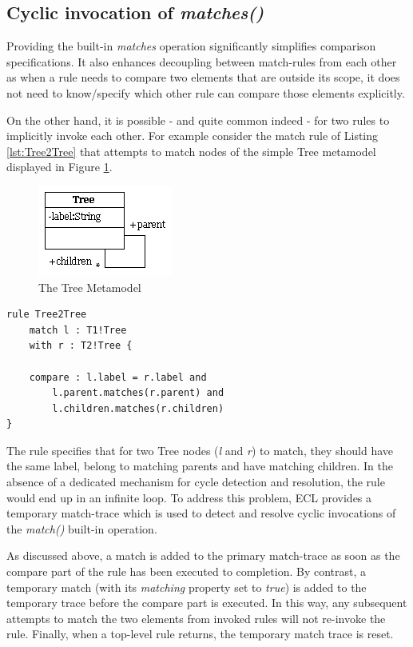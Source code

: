 \subsection{Cyclic invocation of \emph{matches()}}

Providing the built-in \emph{matches} operation significantly simplifies comparison specifications. It also enhances decoupling between match-rules from each other as when a rule needs to compare two elements that are outside its scope, it does not need to know/specify which other rule can compare those elements explicitly.

On the other hand, it is possible - and quite common indeed - for two rules to implicitly invoke each other. For example consider the match rule of Listing \ref{lst:Tree2Tree} that attempts to match nodes of the simple Tree metamodel displayed in Figure \ref{fig:Tree}.

\begin{figure}
	\centering
		\includegraphics{images/metamodels/Tree.png}
	\caption{The Tree Metamodel}
	\label{fig:Tree}
\end{figure}

\begin{lstlisting}[float=tbp, caption=The Tree2Tree rule, label=lst:Tree2Tree, language=ECL]
rule Tree2Tree 
	match l : T1!Tree
	with r : T2!Tree {
	
	compare : l.label = r.label and 
		l.parent.matches(r.parent) and
		l.children.matches(r.children)
}
\end{lstlisting}

The rule specifies that for two Tree nodes (\emph{l} and \emph{r}) to match, they should have the same label, belong to matching parents and have matching children. In the absence of a dedicated mechanism for cycle detection and resolution, the rule would end up in an infinite loop. To address this problem, ECL provides a temporary match-trace which is used to detect and resolve cyclic invocations of the \emph{match()} built-in operation.

As discussed above, a match is added to the primary match-trace as soon as the compare part of the rule has been executed to completion. By contrast, a temporary match (with its \emph{matching} property set to \emph{true}) is added to the temporary trace before the compare part is executed. In this way, any subsequent attempts to match the two elements from invoked rules will not re-invoke the rule. Finally, when a top-level rule returns, the temporary match trace is reset.

